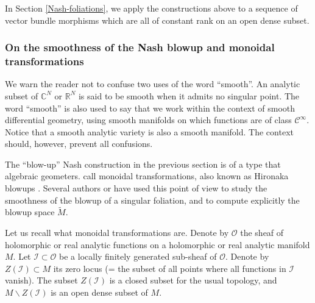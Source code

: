 \documentclass[10pt]{article}
\theoremstyle{plain}
\theoremstyle{definition}
\theoremstyle{remark}
\newcommand{\dd}{\mathrm{d}}
\begin{document}
In Section \ref{Nash-foliations}, we apply the constructions above to a sequence of vector bundle morphisms which are all of constant rank on an open dense subset.

\subsubsection{On the smoothness of the Nash blowup and monoidal transformations}\label{sec:smooth}

We warn the reader not to confuse two uses of the word “smooth”. An analytic subset of $ \mathbb C^N$ or $ \mathbb R^N$ is said to be smooth when it admits no singular point. The word “smooth” is also used to say that we work within the context of smooth differential geometry, using smooth manifolds on which functions are of class $ \mathcal C^\infty$. Notice that a smooth analytic variety is also a smooth manifold. The context should, however, prevent all confusions.

\vspace{0.5cm}

The “blow-up” Nash construction in the previous section is of a type that algebraic geometers. call monoidal transformations, also known as Hironaka blowups \cite{Hironaka-Rossi}.
Several authors \cite{Nobile, Ali-Sinan} or \cite{gonzalez2009nash} have used this point of view to  study the smoothness of the blowup of a singular foliation, and to compute explicitly the blowup space $\widetilde M$.



Let us recall what monoidal transformations are.
Denote by  $ \mathcal O$ the sheaf of holomorphic or real analytic functions on a holomorphic or real analytic manifold $M$. Let $ \mathcal I \subset \mathcal O$ be a locally finitely generated sub-sheaf of  $\mathcal O $. Denote by $ Z(\mathcal I) \subset M$  its zero locus (= the subset of all points where all functions in $ \mathcal I$ vanish). The subset $ Z(\mathcal I)$ is a closed subset for the usual topology, and  $M \backslash  Z(\mathcal I)$ is an open dense subset of $M$.
\end{document}
